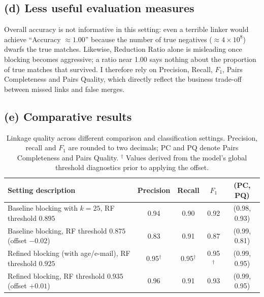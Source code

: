 \documentclass[11pt]{article}
\begin{document}
\subsection*{(d) Less useful evaluation measures}
Overall accuracy is not informative in this setting: even a terrible linker would achieve ``Accuracy $\approx 1.00$'' because the number of true negatives ($\approx 4\times10^8$) dwarfs the true matches. Likewise, Reduction Ratio alone is misleading once blocking becomes aggressive; a ratio near 1.00 says nothing about the proportion of true matches that survived. I therefore rely on Precision, Recall, $F_{1}$, Pairs Completeness and Pairs Quality, which directly reflect the business trade-off between missed links and false merges.

\subsection*{(e) Comparative results}
\begin{table}[h]
    \centering
    \begin{tabular}{@{}p{4.5cm}cccc@{}}
        \toprule
        Setting description & Precision & Recall & $F_{1}$ & (PC, PQ) \\
        \midrule
        Baseline blocking with $k{=}25$, RF threshold $0.895$ & 0.94 & 0.90 & 0.92 & (0.98, 0.93) \\
        Baseline blocking, RF threshold $0.875$ (offset $-0.02$) & 0.83 & 0.91 & 0.87 & (0.99, 0.81) \\
        Refined blocking (with age/e-mail), RF threshold $0.925$ & 0.95$^\dagger$ & 0.95$^\dagger$ & 0.95$^\dagger$ & (0.99, 0.95) \\
        Refined blocking, RF threshold $0.935$ (offset $+0.01$) & 0.96 & 0.91 & 0.93 & (0.99, 0.95) \\
        \bottomrule
    \end{tabular}
    \caption{Linkage quality across different comparison and classification settings. Precision, recall and $F_{1}$ are rounded to two decimals; PC and PQ denote Pairs Completeness and Pairs Quality. $^\dagger$ Values derived from the model's global threshold diagnostics prior to applying the offset.}
    \label{tab:settings}
\end{table}
\end{document}
